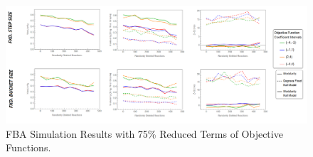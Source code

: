 \begin{landscape}
	\vspace*{\fill}
	\begin{figure}[ht]
		\centering
		\includegraphics[width=1\hsize]{../images/results-obj_func_terms_reduced75-simulation-results.png}
		\caption{FBA Simulation Results with 75\% Reduced Terms of Objective Functions.}
		\label{figure-supplements-obj_func-terms-reduced75}
	\end{figure}
	\vspace*{\fill}
\end{landscape}